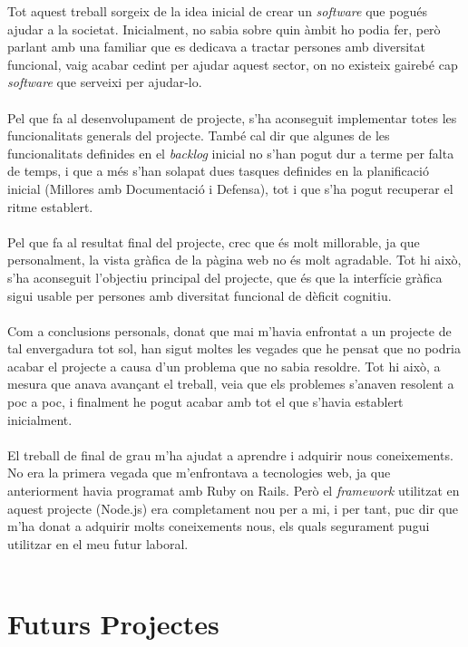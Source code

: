 \documentclass[11pt,catalan,listoffigures,listoftables]{tfgetsinf}
\begin{document}
Tot aquest treball sorgeix de la idea inicial de crear un \textit{software} que pogués ajudar a la societat. Inicialment, no sabia sobre quin àmbit ho podia fer, però parlant amb una familiar que es dedicava a tractar persones amb diversitat funcional, vaig acabar cedint per ajudar aquest sector, on no existeix gairebé cap \textit{software} que serveixi per ajudar-lo.\\ \\
Pel que fa al desenvolupament de projecte, s'ha aconseguit implementar totes les funcionalitats generals del projecte. També cal dir que algunes de les funcionalitats definides en el \textit{backlog} inicial no s'han pogut dur a terme per falta de temps, i que a més s'han solapat dues tasques definides en la planificació inicial (Millores amb Documentació i Defensa), tot i que s'ha pogut recuperar el ritme establert.\\ \\
Pel que fa al resultat final del projecte, crec que és molt millorable, ja que personalment, la vista gràfica de la pàgina web no és molt agradable. Tot hi això, s'ha aconseguit l'objectiu principal del projecte, que és que la interfície gràfica sigui usable per persones amb diversitat funcional de dèficit cognitiu.\\ \\
Com a conclusions personals, donat que mai m'havia enfrontat a un projecte de tal envergadura tot sol, han sigut moltes les vegades que he pensat que no podria acabar el projecte a causa d'un problema que no sabia resoldre. Tot hi això, a mesura que anava avançant el treball, veia que els problemes s'anaven resolent a poc a poc, i finalment he pogut acabar amb tot el que s'havia establert inicialment.\\ \\
El treball de final de grau m'ha ajudat a aprendre i adquirir nous coneixements. No era la primera vegada que m'enfrontava a tecnologies web, ja que anteriorment havia programat amb Ruby on Rails. Però el \textit{framework} utilitzat en aquest projecte (Node.js) era completament nou per a mi, i per tant, puc dir que m'ha donat a adquirir molts coneixements nous, els quals segurament pugui utilitzar en el meu futur laboral.\\ \\
\newpage
\section{Futurs Projectes}
\end{document}
